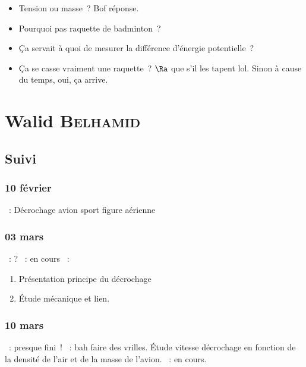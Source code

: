 \documentclass[a4paper, 11pt, final, garamond]{book}
\begin{document}
\begin{itemize}
  \item Tension ou masse~? Bof réponse.
  \item Pourquoi pas raquette de badminton~?
  \item Ça servait à quoi de mesurer la différence d'énergie potentielle~?
  \item Ça se casse vraiment une raquette~? $\Ra $ que s'il les tapent lol.
    Sinon à cause du temps, oui, ça arrive.
\end{itemize}

\chapter{Walid \textsc{Belhamid}}
\label{ch:walid}
\section{Suivi}
\subsection{10 février}
\begin{itemize}
    ~: Décrochage avion sport figure aérienne
\end{itemize}

\subsection{03 mars}
\begin{itemize}
    ~: ?
    ~: en cours
    ~:
        \begin{enumerate}[label=\protect\fbox{\Roman*}]
            \item Présentation principe du décrochage
            \item Étude mécanique et lien.
        \end{enumerate}
\end{itemize}

\subsection{10 mars}
\begin{itemize}
    ~: presque fini~!
    ~: bah faire des vrilles. Étude vitesse décrochage en fonction
        de la densité de l'air et de la masse de l'avion.
    ~: en cours.
\end{itemize}
\end{document}
